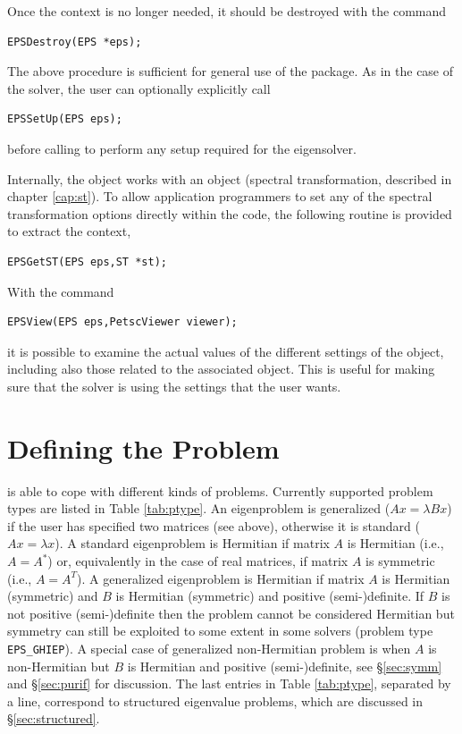 Once the  context is no longer needed, it should be destroyed with the command
        \begin{Verbatim}[fontsize=\small]
        EPSDestroy(EPS *eps);
        \end{Verbatim}

The above procedure is sufficient for general use of the  package. As in the case of the  solver, the user can optionally explicitly call
        \begin{Verbatim}[fontsize=\small]
        EPSSetUp(EPS eps);
        \end{Verbatim}
before calling  to perform any setup required for the eigensolver.

Internally, the  object works with an  object (spectral transformation, described in chapter \ref{cap:st}). To allow application programmers to set any of the spectral transformation options directly within the code, the following routine is provided to extract the  context,
        \begin{Verbatim}[fontsize=\small]
        EPSGetST(EPS eps,ST *st);
        \end{Verbatim}

With the command
        \begin{Verbatim}[fontsize=\small]
        EPSView(EPS eps,PetscViewer viewer);
        \end{Verbatim}
it is possible to examine the actual values of the different settings of the  object, including also those related to the associated  object. This is useful for making sure that the solver is using the settings that the user wants.

\section{Defining the Problem}
\label{sec:defprob}

\slepc is able to cope with different kinds of problems. Currently supported problem types are listed in Table \ref{tab:ptype}. An eigenproblem is generalized ($Ax=\lambda Bx$) if the user has specified two matrices (see  above), otherwise it is standard ($Ax=\lambda x$). A standard eigenproblem is Hermitian if matrix $A$ is Hermitian (i.e., $A=A^*$) or, equivalently in the case of real matrices, if matrix $A$ is symmetric (i.e., $A=A^T$). A generalized eigenproblem is Hermitian if matrix $A$ is Hermitian (symmetric) and $B$ is Hermitian (symmetric) and positive (semi-)definite.
If $B$ is not positive (semi-)definite then the problem cannot be considered Hermitian but symmetry can still be exploited to some extent in some solvers (problem type \texttt{EPS\_GHIEP}).
A special case of generalized non-Hermitian problem is when $A$ is non-Hermitian but $B$ is Hermitian and positive (semi-)definite, see \S\ref{sec:symm} and \S\ref{sec:purif} for discussion.
The last entries in Table \ref{tab:ptype}, separated by a line, correspond to structured eigenvalue problems, which are discussed in \S\ref{sec:structured}.

